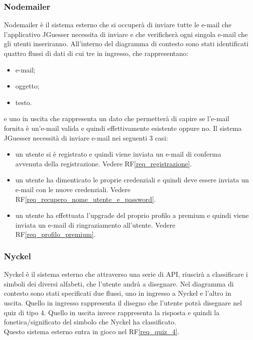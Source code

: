 \subsubsection{Nodemailer}
Nodemailer è il sistema esterno che si occuperà di inviare tutte le e-mail che l'applicativo JGuesser necessita di inviare e che verificherà ogni singola e-mail che gli utenti inseriranno. All'interno del diagramma di contesto sono stati identificati quattro flussi di dati di cui tre in ingresso, che rappresentano: 
\begin{itemize}
    \item e-mail;
    \item oggetto;
    \item testo.
\end{itemize}
\noindent
e uno in uscita che rappresenta un dato che permetterà di capire se l'e-mail fornita è un'e-mail valida e quindi effettivamente esistente oppure no. Il sistema JGuesser necessità di inviare e-mail nei seguenti 3 casi:
\begin{itemize}
    \item un utente si è registrato e quindi viene inviata un e-mail di conferma avvenuta della registrazione. Vedere RF\ref{req_registrazione}.
    \item un utente ha dimenticato le proprie credenziali e quindi deve essere inviata un e-mail con le nuove credenziali. Vedere RF\ref{req_recupero_nome_utente_e_password}.
    \item un utente ha effettuata l'upgrade del proprio profilo a premium e quindi viene inviata un e-mail di ringraziamento all'utente. Vedere RF\ref{req_profilo_premium}.
\end{itemize}

\subsubsection{Nyckel}
Nyckel è il sistema esterno che attraverso una serie di API, riuscirà a classificare i simboli dei diversi alfabeti, che l'utente andrà a disegnare. Nel diagramma di contesto sono stati specificati due flussi, uno in ingresso a Nyckel e l'altro in uscita. Quello in ingresso rappresenta il disegno che l'utente potrà disegnare nel quiz di tipo 4. Quello in uscita invece rappresenta la risposta e quindi la fonetica/significato del simbolo che Nyckel ha classificato. \\
Questo sistema esterno entra in gioco nel RF\ref{req_quiz_4}.

